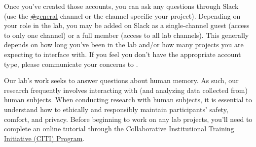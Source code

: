\documentclass{tufte-book} %
\begin{document}
Once you've created those accounts, you can ask any questions through
Slack (use the
\href{https://context-lab.slack.com/messages/general/}{\#general}
  channel or the channel specific your project).  Depending on your
role in the lab, you may be added on Slack as a single-channel guest
(access to only one channel) or a full member (access to all lab
channels).  This generally depends on how long you've been in the lab
and/or how many projects you are expecting to interface with.  If you
feel you don't have the appropriate account type, please communicate
your concerns to \director.


\noindent Our lab's work seeks to answer questions about human memory.  As such,
our research frequently involves interacting with (and analyzing data collected from)
human subjects.  When conducting research with human subjects, it is essential
to understand how to ethically and responsibly maintain participants' safety,
comfort, and privacy.  Before beginning to work on any lab projects, you'll
need to complete an online tutorial through the \href{https://about.citiprogram.org}
{Collaborative Institutional Training Initiative (CITI) Program}.
\end{document}
